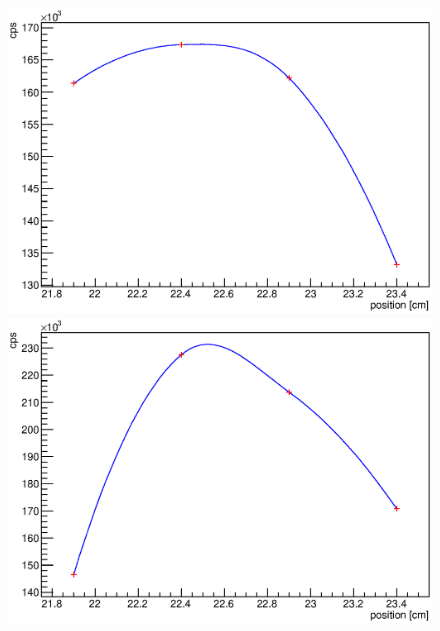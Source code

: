 \begin{figure}
\begin{minipage}[d]{0.24 \textwidth}
		  \includegraphics[width=\textwidth]{graphics/cobalt/modules/4A.eps}
	\end{minipage}
	\begin{minipage}[d]{0.24 \textwidth}
		  \includegraphics[width=\textwidth]{graphics/cobalt/modules/4B.eps}
	\end{minipage}\newline
	

\end{figure}
